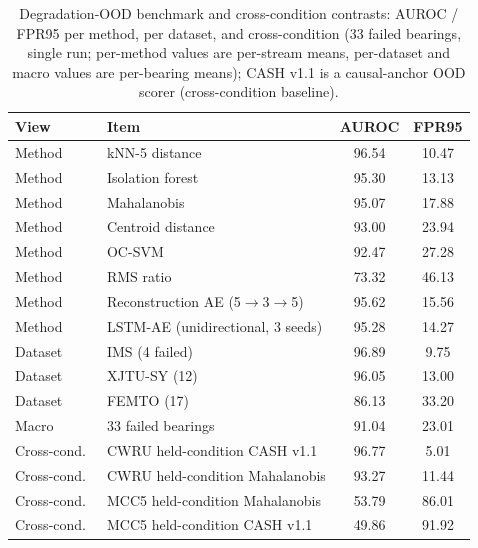 \documentclass[journal]{IEEEtran}
\begin{document}
\begin{table}[!t]
\caption{Degradation-OOD benchmark and cross-condition contrasts: AUROC / FPR95 per method, per dataset, and cross-condition (33 failed bearings, single run; per-method values are per-stream means, per-dataset and macro values are per-bearing means); CASH v1.1 is a causal-anchor OOD scorer (cross-condition baseline).}
\label{tab:ood}
\centering
\begin{tabular}{l l c c}
\toprule
View & Item & AUROC & FPR95\\
\midrule
Method & kNN-5 distance & 96.54 & 10.47\\
Method & Isolation forest & 95.30 & 13.13\\
Method & Mahalanobis & 95.07 & 17.88\\
Method & Centroid distance & 93.00 & 23.94\\
Method & OC-SVM & 92.47 & 27.28\\
Method & RMS ratio & 73.32 & 46.13\\
Method & Reconstruction AE (5$\to$3$\to$5) & 95.62 & 15.56\\
Method & LSTM-AE (unidirectional, 3 seeds) & 95.28 & 14.27\\
Dataset & IMS (4 failed) & 96.89 & 9.75\\
Dataset & XJTU-SY (12) & 96.05 & 13.00\\
Dataset & FEMTO (17) & 86.13 & 33.20\\
Macro & 33 failed bearings & 91.04 & 23.01\\
Cross-cond.\ & CWRU held-condition CASH v1.1 & 96.77 & 5.01\\
Cross-cond.\ & CWRU held-condition Mahalanobis & 93.27 & 11.44\\
Cross-cond.\ & MCC5 held-condition Mahalanobis & 53.79 & 86.01\\
Cross-cond.\ & MCC5 held-condition CASH v1.1 & 49.86 & 91.92\\
\bottomrule
\end{tabular}
\end{table}
\end{document}
